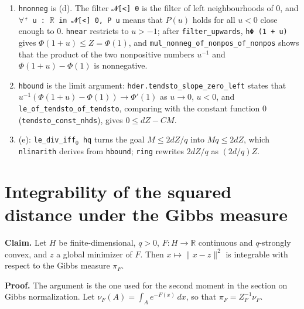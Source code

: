 \documentclass[11pt,a4paper]{article}
\begin{document}
\begin{leanbox}
\begin{enumerate}
\item \texttt{hnonneg} is (d). The filter \texttt{{\leanfallback 𝓝}[<] 0} is the filter of left neighbourhoods of \(0\), and \texttt{\ensuremath{\forall}ᶠ u : \ensuremath{\mathbb R} in {\leanfallback 𝓝}[<] 0, P u} means that \(P(u)\) holds for all \(u<0\) close enough to \(0\). \texttt{hnear} restricts to \(u>-1\); after \texttt{filter\_\allowbreak{}upwards}, \texttt{h\allowbreak{}Φ (1 + u)} gives \(\Phi(1+u)\le Z=\Phi(1)\), and \texttt{mul\_\allowbreak{}nonneg\_\allowbreak{}of\_\allowbreak{}nonpos\_\allowbreak{}of\_\allowbreak{}nonpos} shows that the product of the two nonpositive numbers \(u^{-1}\) and \(\Phi(1+u)-\Phi(1)\) is nonnegative.

\item \texttt{hbound} is the limit argument: \texttt{hder.\allowbreak{}tendsto\_\allowbreak{}slope\_\allowbreak{}zero\_\allowbreak{}left} states that \(u^{-1}(\Phi(1+u)-\Phi(1))\to\Phi'(1)\) as \(u\to0\), \(u<0\), and \texttt{le\_\allowbreak{}of\_\allowbreak{}tendsto\_\allowbreak{}of\_\allowbreak{}tendsto}, comparing with the constant function \(0\) (\texttt{tendsto\_\allowbreak{}const\_\allowbreak{}nhds}), gives \(0\le dZ-CM\).

\item (e): \texttt{le\_\allowbreak{}div\_\allowbreak{}iff\ensuremath{{}_{0}} hq} turns the goal \(M\le2dZ/q\) into \(Mq\le2dZ\), which \texttt{nlinarith} derives from \texttt{hbound}; \texttt{ring} rewrites \(2dZ/q\) as \((2d/q)Z\).

\end{enumerate}
\end{leanbox}

\section{\texorpdfstring{Integrability of the squared distance under the Gibbs measure}{Integrability of the squared distance under the Gibbs measure}}


\textbf{Claim.} Let \(H\) be finite-dimensional, \(q>0\), \(F:H\to\mathbb R\) continuous and \(q\)-strongly convex, and \(z\) a global minimizer of \(F\). Then \(x\mapsto\|x-z\|^2\) is integrable with respect to the Gibbs measure \(\pi_F\).




\textbf{Proof.} The argument is the one used for the second moment in the section on Gibbs normalization. Let \(\nu_F(A)=\int_Ae^{-F(x)}\,dx\), so that \(\pi_F=Z_F^{-1}\nu_F\).
\end{document}
